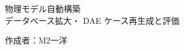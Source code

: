 \documentclass[a4j,dvipdfmx,12pt]{jresume}
\begin{document}


\medskip
\begin{center}
  {\Large 物理モデル自動構築\\ 
  データベース拡大・
DAE ケース再生成と評価}
\end{center}

\begin{flushright}
作成者：M2\quad 一洋\\
\end{flushright}
\end{document}
